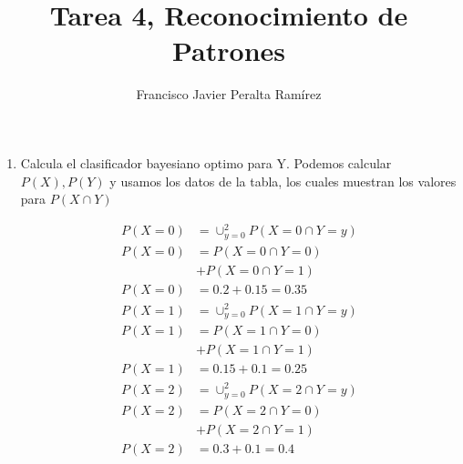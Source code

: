 \documentclass{article}
\title {Tarea 4, Reconocimiento de Patrones}
\author {Francisco Javier Peralta Ramírez}
\date{\vspace{-2ex}}
\begin{document}
\vspace{-2ex}
\maketitle
\begin{enumerate}

\item Calcula el clasificador bayesiano optimo para Y. Podemos calcular $P(X), P(Y)$ y usamos los datos de la tabla, los cuales muestran los valores para $P(X \cap Y)$
\vspace{-4ex}
\begin{multicols}{3}
\small
  \begin{align*}
    P(X = 0) &= \cup_{y = 0}^{2} P( X = 0 \cap Y = y)\\
    P(X = 0) &= P(X = 0 \cap Y = 0) \\&+ P(X = 0 \cap Y = 1)\\
    P(X = 0) &= 0.2 + 0.15 = 0.35
  \end{align*}\break
  \begin{align*}
    P(X = 1) &= \cup_{y = 0}^{2} P( X = 1 \cap Y = y)\\
    P(X = 1) &= P(X = 1 \cap Y = 0) \\&+ P(X = 1 \cap Y = 1)\\
    P(X = 1) &= 0.15 + 0.1 = 0.25
  \end{align*}\break
  \begin{align*}
    P(X = 2) &= \cup_{y = 0}^{2} P( X = 2 \cap Y = y)\\
    P(X = 2) &= P(X = 2 \cap Y = 0) \\&+ P(X = 2 \cap Y = 1)\\
    P(X = 2) &= 0.3 + 0.1 = 0.4
  \end{align*}
\end{multicols}


\end{enumerate}
\end{document}
